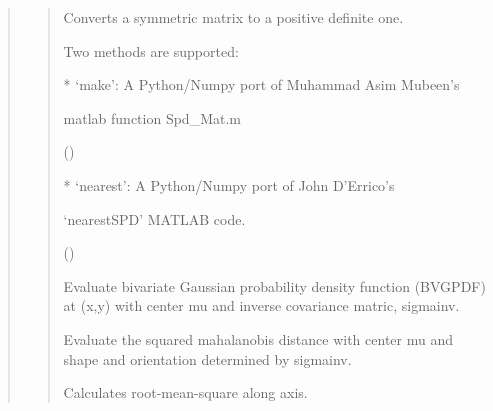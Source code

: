 \documentclass[letterpaper,10pt,english]{sphinxmanual}
\begin{document}
\begin{quote}
\begin{quote}
\begin{description}
\item[{symmM\_to\_posdefM()}] \leavevmode
\begin{DUlineblock}{0em}
\item[] Converts a symmetric matrix to a positive definite one. 
\item[] Two methods are supported:
\item[]
\begin{DUlineblock}{\DUlineblockindent}
\item[] * ‘make’: A Python/Numpy port of Muhammad Asim Mubeen’s
\item[]
\begin{DUlineblock}{\DUlineblockindent}
\item[]
\begin{DUlineblock}{\DUlineblockindent}
\item[] matlab function Spd\_Mat.m 
\end{DUlineblock}
\item[] ()
\end{DUlineblock}
\item[] * ‘nearest’: A Python/Numpy port of John D’Errico’s 
\item[]
\begin{DUlineblock}{\DUlineblockindent}
\item[]
\begin{DUlineblock}{\DUlineblockindent}
\item[] ‘nearestSPD’ MATLAB code. 
\end{DUlineblock}
\item[] ()
\end{DUlineblock}
\end{DUlineblock}
\end{DUlineblock}

\item[{bvgpdf()}] \leavevmode
Evaluate bivariate Gaussian probability density function (BVGPDF) 
at (x,y) with center mu and inverse covariance matric, sigmainv.

\item[{mahalanobis2()}] \leavevmode
Evaluate the squared mahalanobis distance with center mu and 
shape and orientation determined by sigmainv.

\item[{rms()}] \leavevmode
Calculates root-mean-square along axis.


\end{description}
\end{quote}
\end{quote}
\end{document}
